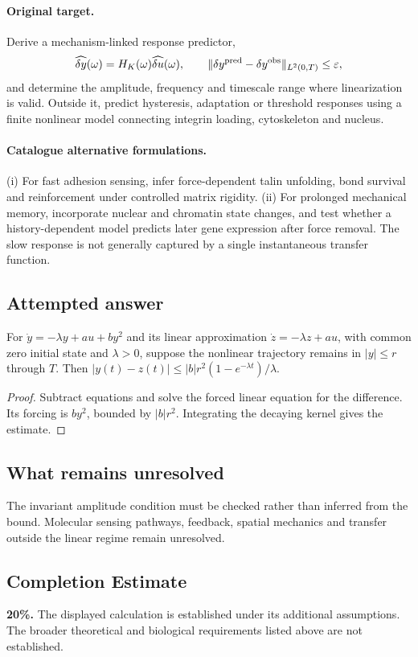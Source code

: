 \documentclass[11pt]{article}
\begin{document}
\paragraph{Original target.}
Derive a mechanism-linked response predictor,
\[\widehat{\delta y}(\omega)=H_K(\omega)\widehat{\delta u}(\omega),\qquad \|\delta y^{\rm pred}-\delta y^{\rm obs}\|_{L^2(0,T)}\le\varepsilon,\]
and determine the amplitude, frequency and timescale range where linearization is valid. Outside it, predict hysteresis, adaptation or threshold responses using a finite nonlinear model connecting integrin loading, cytoskeleton and nucleus.
\paragraph{Catalogue alternative formulations.}
(i) For fast adhesion sensing, infer force-dependent talin unfolding, bond survival and reinforcement under controlled matrix rigidity. (ii) For prolonged mechanical memory, incorporate nuclear and chromatin state changes, and test whether a history-dependent model predicts later gene expression after force removal. The slow response is not generally captured by a single instantaneous transfer function.
\subsection{Attempted answer}
\begin{proposition}
For $\dot y=-\lambda y+au+by^2$ and its linear approximation $\dot z=-\lambda z+au$, with common zero initial state and $\lambda>0$, suppose the nonlinear trajectory remains in $|y|\leq r$ through $T$. Then $|y(t)-z(t)|\leq |b|r^2(1-e^{-\lambda t})/\lambda$.
\end{proposition}
\begin{proof}
Subtract equations and solve the forced linear equation for the difference. Its forcing is $by^2$, bounded by $|b|r^2$. Integrating the decaying kernel gives the estimate.
\end{proof}
\subsection{What remains unresolved}
The invariant amplitude condition must be checked rather than inferred from the bound. Molecular sensing pathways, feedback, spatial mechanics and transfer outside the linear regime remain unresolved.
\subsection{Completion Estimate}
\textbf{20\%.} The displayed calculation is established under its additional assumptions. The broader theoretical and biological requirements listed above are not established.
\end{document}
